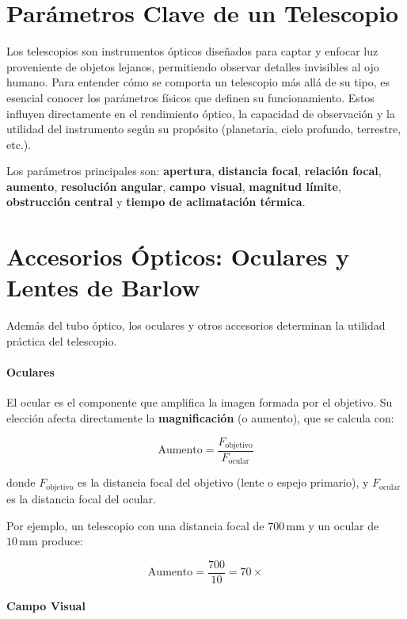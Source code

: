 \section{Parámetros Clave de un Telescopio}

Los telescopios son instrumentos ópticos diseñados para captar y enfocar luz proveniente de objetos lejanos, permitiendo observar detalles invisibles al ojo humano. Para entender cómo se comporta un telescopio más allá de su tipo, es esencial conocer los parámetros físicos que definen su funcionamiento. Estos influyen directamente en el rendimiento óptico, la capacidad de observación y la utilidad del instrumento según su propósito (planetaria, cielo profundo, terrestre, etc.).

Los parámetros principales son: \textbf{apertura}, \textbf{distancia focal}, \textbf{relación focal}, \textbf{aumento}, \textbf{resolución angular}, \textbf{campo visual}, \textbf{magnitud límite}, \textbf{obstrucción central} y \textbf{tiempo de aclimatación térmica}.

\section{Accesorios Ópticos: Oculares y Lentes de Barlow}
\label{sec:oculares_y_barlow}

Además del tubo óptico, los oculares y otros accesorios determinan la utilidad práctica del telescopio.

\paragraph{Oculares}
El ocular es el componente que amplifica la imagen formada por el objetivo. Su elección afecta directamente la \textbf{magnificación} (o aumento), que se calcula con:

\begin{equation}
	\text{Aumento} = \frac{F_{\text{objetivo}}}{F_{\text{ocular}}}
	\label{eq:aumento}
\end{equation}

donde $F_{\text{objetivo}}$ es la distancia focal del objetivo (lente o espejo primario), y $F_{\text{ocular}}$ es la distancia focal del ocular.

Por ejemplo, un telescopio con una distancia focal de $700\,\mathrm{mm}$ y un ocular de $10\,\mathrm{mm}$ produce:

\[
\text{Aumento} = \frac{700}{10} = 70\times
\]

\paragraph{Campo Visual}


